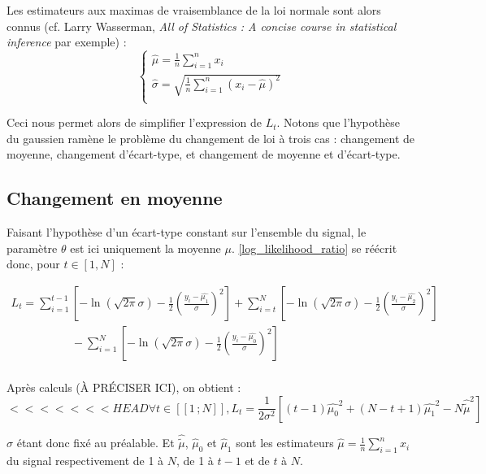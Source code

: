 \documentclass[french,12pt,notitlepage]{report}
\begin{document}
	Les estimateurs aux maximas de vraisemblance de la loi normale sont alors connus (cf. Larry Wasserman, \textit{All of Statistics : A concise course in statistical inference} par exemple) :
	\begin{equation}
	\left\{
	\begin{array}{ll}
		\hat{\mu} = \frac{1}{n} \sum_{i=1}^n x_i \\
		\hat{\sigma} = \sqrt{\frac{1}{n} \sum_{i=1}^n (x_i - \hat{\mu})^2} \\
	\end{array}
	\right.
	\label{estimators}
	\end{equation}

	Ceci nous permet alors de simplifier l'expression de $L_t$. Notons que l'hypothèse du gaussien ramène le problème du changement de loi à trois cas : changement de moyenne, changement d'écart-type, et changement de moyenne et d'écart-type.

	\subsection{Changement en moyenne}
	Faisant l'hypothèse d'un écart-type constant sur l'ensemble du signal, le paramètre $\theta$ est ici uniquement la moyenne $\mu$. \ref{log_likelihood_ratio} se réécrit donc, pour $t \in [1,N]$ :

	\begin{equation*}
	\begin{array}{ll}
		L_t = \sum_{i=1}^{t-1} \left[-\ln (\sqrt{2 \pi} \sigma)-\frac{1}{2}\left( \frac{y_i-\hat{\mu_1}}{\sigma} \right) ^2 \right] + \sum_{i=t}^{N} \left[-\ln (\sqrt{2 \pi} \sigma)-\frac{1}{2}\left( \frac{y_i-\hat{\mu_2}}{\sigma} \right) ^2 \right] \\
		~~~~~~~~~~~~~~~~~~~~~~~~ - \sum_{i=1}^{N} \left[-\ln (\sqrt{2 \pi} \sigma)-\frac{1}{2}\left( \frac{y_i-\hat{\mu_0}}{\sigma} \right) ^2 \right] \\
	\end{array}
	\end{equation*}

	Après calculs (À PRÉCISER ICI), on obtient :
	\begin{equation}
<<<<<<< HEAD
		\forall t \in [\![1\,; N]\!], L_t = \frac{1}{2 \sigma ^2}\left[(t-1)\hat{\mu_0}^2 + (N - t + 1)\hat{\mu_1}^2 - N\hat{\tilde\mu}^2 \right]
		\label{meanchange}
	\end{equation}
	
	$\sigma$ étant donc fixé au préalable. Et $\hat{\tilde\mu}$, $\hat\mu_0$ et $\hat\mu_1$ sont les estimateurs $\hat\mu=\frac1n\sum_{i=1}^nx_i$ du signal respectivement de 1 à $N$, de 1 à $t-1$ et de $t$ à $N$.
	\\
	
\end{document}
